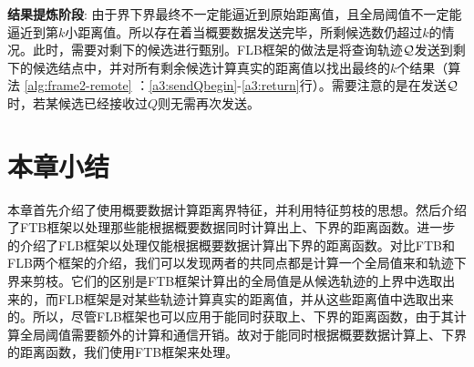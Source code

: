 \textbf{结果提炼阶段}: 由于界下界最终不一定能逼近到原始距离值，且全局阈值不一定能逼近到第$k$小距离值。所以存在着当概要数据发送完毕，所剩候选数仍超过$k$的情况。此时，需要对剩下的候选进行甄别。FLB框架的做法是将查询轨迹$\cal Q$发送到剩下的候选结点中，并对所有剩余候选计算真实的距离值以找出最终的$k$个结果（算法 \ref{alg:frame2-remote} ：\ref{a3:sendQbegin}-\ref{a3:return}行）。需要注意的是在发送$\cal Q$时，若某候选已经接收过$Q$则无需再次发送。

\section{本章小结}\label{sec-c3-FrameCMP}
本章首先介绍了使用概要数据计算距离界特征，并利用特征剪枝的思想。然后介绍了FTB框架以处理那些能根据概要数据同时计算出上、下界的距离函数。进一步的介绍了FLB框架以处理仅能根据概要数据计算出下界的距离函数。对比FTB和FLB两个框架的介绍，我们可以发现两者的共同点都是计算一个全局值来和轨迹下界来剪枝。它们的区别是FTB框架计算出的全局值是从候选轨迹的上界中选取出来的，而FLB框架是对某些轨迹计算真实的距离值，并从这些距离值中选取出来的。所以，尽管FLB框架也可以应用于能同时获取上、下界的距离函数，由于其计算全局阈值需要额外的计算和通信开销。故对于能同时根据概要数据计算上、下界的距离函数，我们使用FTB框架来处理。


\clearpage
\phantom{s}
\clearpage